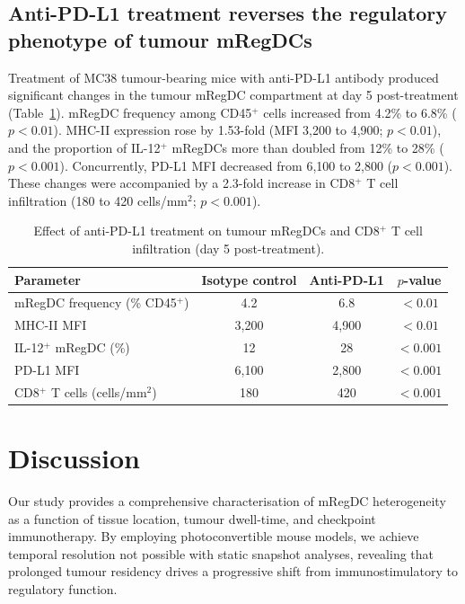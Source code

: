 \documentclass[11pt]{article}
\begin{document}
\subsection{Anti-PD-L1 treatment reverses the regulatory phenotype of tumour mRegDCs}

Treatment of MC38 tumour-bearing mice with anti-PD-L1 antibody produced significant changes in the tumour mRegDC compartment at day 5 post-treatment (Table~\ref{tab:treatment}). mRegDC frequency among CD45$^{+}$ cells increased from 4.2\% to 6.8\% ($p < 0.01$). MHC-II expression rose by 1.53-fold (MFI 3,200 to 4,900; $p < 0.01$), and the proportion of IL-12$^{+}$ mRegDCs more than doubled from 12\% to 28\% ($p < 0.001$). Concurrently, PD-L1 MFI decreased from 6,100 to 2,800 ($p < 0.001$). These changes were accompanied by a 2.3-fold increase in CD8$^{+}$ T cell infiltration (180 to 420 cells/mm$^{2}$; $p < 0.001$).

\begin{table}[htbp]
\centering
\caption{Effect of anti-PD-L1 treatment on tumour mRegDCs and CD8$^{+}$ T cell infiltration (day 5 post-treatment).}
\label{tab:treatment}
\begin{tabular}{@{}lccc@{}}
\toprule
Parameter & Isotype control & Anti-PD-L1 & $p$-value \\
\midrule
mRegDC frequency (\% CD45$^{+}$) & 4.2  & 6.8  & $<0.01$  \\
MHC-II MFI                       & 3,200 & 4,900 & $<0.01$  \\
IL-12$^{+}$ mRegDC (\%)          & 12   & 28   & $<0.001$ \\
PD-L1 MFI                        & 6,100 & 2,800 & $<0.001$ \\
CD8$^{+}$ T cells (cells/mm$^{2}$) & 180 & 420  & $<0.001$ \\
\bottomrule
\end{tabular}
\end{table}

\section{Discussion}

Our study provides a comprehensive characterisation of mRegDC heterogeneity as a function of tissue location, tumour dwell-time, and checkpoint immunotherapy. By employing photoconvertible mouse models, we achieve temporal resolution not possible with static snapshot analyses, revealing that prolonged tumour residency drives a progressive shift from immunostimulatory to regulatory function.
\end{document}
